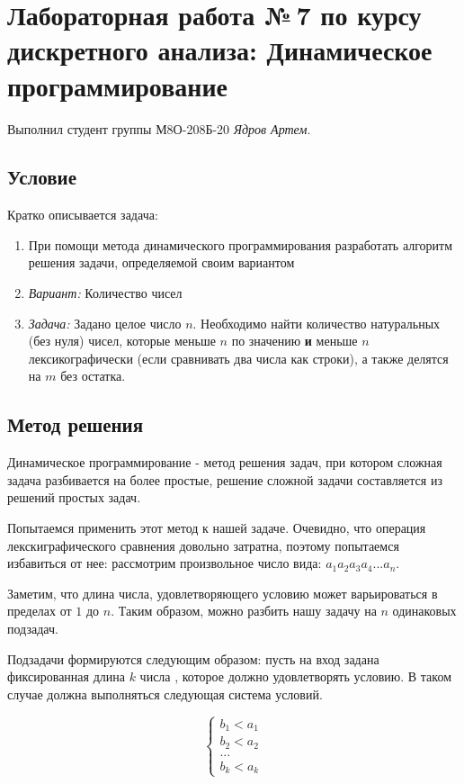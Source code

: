 \documentclass[12pt]{article}
\begin{document}
	
	\section*{Лабораторная работа №\,7 по курсу дискретного анализа: Динамическое программирование}
	
	Выполнил студент группы М8О-208Б-20 \textit{Ядров Артем}.
	
	\subsection*{Условие}
	
	Кратко описывается задача: 
	\begin{enumerate}
		\item При помощи метода динамического программирования разработать алгоритм решения задачи, определяемой
		своим вариантом
		\item \textit{Вариант:} Количество чисел
		\item \textit{Задача:} Задано целое число $n$. Необходимо найти количество натуральных (без нуля) чисел, которые меньше $n$ по значению \textbf{и} меньше $n$ лексикографически (если сравнивать два числа как строки), а также делятся на $m$ без остатка.
	\end{enumerate}
	
	\subsection*{Метод решения}
	
	Динамическое программирование - метод решения задач, при котором сложная задача разбивается на более простые, решение сложной задачи составляется из решений простых задач.
	
	Попытаемся применить этот метод к нашей задаче. Очевидно, что операция лекскиграфического сравнения довольно затратна, поэтому попытаемся избавиться от нее: рассмотрим произвольное число вида:
	$a_1a_2a_3a_4...a_n$.
	
	Заметим, что длина числа, удовлетворяющего условию может варьироваться в пределах от $1$ до $n$. Таким образом, можно разбить нашу задачу на $n$ одинаковых подзадач.
	
	Подзадачи формируются следующим образом: пусть на вход задана фиксированная длина $k$ числа , которое должно удовлетворять условию. В таком случае должна выполняться следующая система условий.
	
	\begin{equation*}
		\begin{cases}
			b_1 < a_1
			\\
			b_2 < a_2
			\\
			...
			\\
			b_k < a_k
		\end{cases}
	\end{equation*}
	
\end{document}
